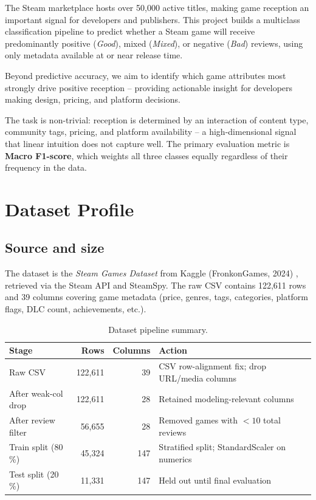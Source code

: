 \documentclass[11pt, a4paper]{article}
\begin{document}
The Steam marketplace hosts over 50,000 active titles, making game reception an important
signal for developers and publishers. This project builds a multiclass classification pipeline
to predict whether a Steam game will receive predominantly positive (\textit{Good}),
mixed (\textit{Mixed}), or negative (\textit{Bad}) reviews, using only metadata available at
or near release time.

Beyond predictive accuracy, we aim to identify which game attributes most strongly drive
positive reception -- providing actionable insight for developers making design, pricing,
and platform decisions.

The task is non-trivial: reception is determined by an interaction of content type,
community tags, pricing, and platform availability -- a high-dimensional signal that
linear intuition does not capture well.
The primary evaluation metric is \textbf{Macro F1-score}, which weights all three
classes equally regardless of their frequency in the data.

\section{Dataset Profile}
\label{sec:data}

\subsection{Source and size}
The dataset is the \textit{Steam Games Dataset} from Kaggle
(FronkonGames, 2024) \cite{fronkon2024}, retrieved via the Steam API and SteamSpy.
The raw CSV contains 122,611 rows and 39 columns covering game metadata
(price, genres, tags, categories, platform flags, DLC count, achievements, etc.).

\begin{table}[H]
  \centering\small
  \caption{Dataset pipeline summary.}
  \label{tab:datapipeline}
  \begin{tabularx}{\linewidth}{lrrl}
    \toprule
    \textbf{Stage} & \textbf{Rows} & \textbf{Columns} & \textbf{Action} \\
    \midrule
    Raw CSV              & 122,611 & 39 & CSV row-alignment fix; drop URL/media columns \\
    After weak-col drop  & 122,611 & 28 & Retained modeling-relevant columns \\
    After review filter  &  56,655 & 28 & Removed games with $<10$ total reviews \\
    Train split (80\,\%) &  45,324 & 147 & Stratified split; StandardScaler on numerics \\
    Test split  (20\,\%) &  11,331 & 147 & Held out until final evaluation \\
    \bottomrule
  \end{tabularx}
\end{table}
\end{document}
